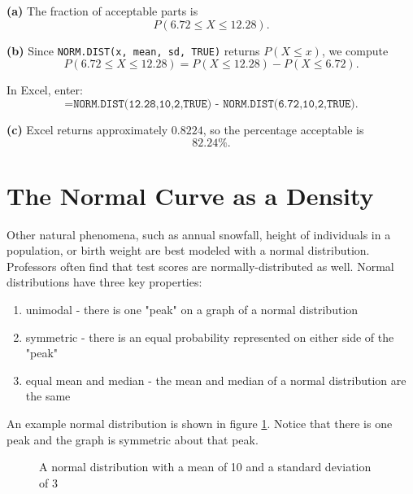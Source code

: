 \begin{Answer}[ref = normalt1]

\textbf{(a)} The fraction of acceptable parts is
\[
P(6.72 \le X \le 12.28).
\]

\textbf{(b)} Since \texttt{NORM.DIST(x, mean, sd, TRUE)} returns $P(X \le x)$,
we compute
\[
P(6.72 \le X \le 12.28)=P(X \le 12.28)-P(X \le 6.72).
\]

In Excel, enter:
\[
\texttt{=NORM.DIST(12.28,10,2,TRUE) - NORM.DIST(6.72,10,2,TRUE)}.
\]

\textbf{(c)} Excel returns approximately $0.8224$, so the percentage acceptable is
\[
82.24\%.
\]

\end{Answer}

\section{The Normal Curve as a Density}
Other natural phenomena, such as annual snowfall, height of individuals in a 
population, or birth weight are best modeled with a normal distribution. 
Professors often find that test scores are normally-distributed as well. 
Normal distributions have three key properties:
\begin{enumerate}
\item unimodal - there is one "peak" on a graph of a normal distribution
\item symmetric - there is an equal probability represented on either side of 
the "peak"
\item equal mean and median - the mean and median of a normal distribution are 
the same
\end{enumerate}

An example normal distribution is shown in figure \ref{fig:normal_pdf}. Notice 
that there is one peak and the graph is symmetric about that peak. 

\begin{figure}[H]
	\centering
    \label{fig:normal_pdf}
    \caption{A normal distribution with a mean of 10 and a standard deviation 
    of 3}
\end{figure}

